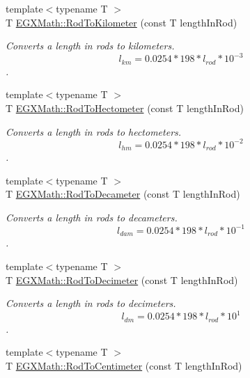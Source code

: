 \begin{DoxyCompactItemize}
{\footnotesize template$<$typename T $>$ }\\T \mbox{\hyperlink{group___e_g_x_math-_conversions-_length_conversions-_surveyors-_rod-_s_i_ga074418cb0c673bef5eed361a610866a0}{E\+G\+X\+Math\+::\+Rod\+To\+Kilometer}} (const T length\+In\+Rod)
\begin{DoxyCompactList}\small\item\em Converts a length in rods to kilometers. \[ l_{km}=0.0254 * 198 * l_{rod} * 10^{-3} \]. \end{DoxyCompactList}\item 
{\footnotesize template$<$typename T $>$ }\\T \mbox{\hyperlink{group___e_g_x_math-_conversions-_length_conversions-_surveyors-_rod-_s_i_ga9a5cefa380459848ac99b3f9784817ce}{E\+G\+X\+Math\+::\+Rod\+To\+Hectometer}} (const T length\+In\+Rod)
\begin{DoxyCompactList}\small\item\em Converts a length in rods to hectometers. \[ l_{hm}=0.0254 * 198 * l_{rod} * 10^{-2} \]. \end{DoxyCompactList}\item 
{\footnotesize template$<$typename T $>$ }\\T \mbox{\hyperlink{group___e_g_x_math-_conversions-_length_conversions-_surveyors-_rod-_s_i_gaecb39eb3cc482aa4586ecbce219b6f34}{E\+G\+X\+Math\+::\+Rod\+To\+Decameter}} (const T length\+In\+Rod)
\begin{DoxyCompactList}\small\item\em Converts a length in rods to decameters. \[ l_{dam}=0.0254 * 198 * l_{rod} * 10^{-1} \]. \end{DoxyCompactList}\item 
{\footnotesize template$<$typename T $>$ }\\T \mbox{\hyperlink{group___e_g_x_math-_conversions-_length_conversions-_surveyors-_rod-_s_i_gafaf133f63aeedbfc19093745bd005dca}{E\+G\+X\+Math\+::\+Rod\+To\+Decimeter}} (const T length\+In\+Rod)
\begin{DoxyCompactList}\small\item\em Converts a length in rods to decimeters. \[ l_{dm}=0.0254 * 198 * l_{rod} * 10^{1} \]. \end{DoxyCompactList}\item 
{\footnotesize template$<$typename T $>$ }\\T \mbox{\hyperlink{group___e_g_x_math-_conversions-_length_conversions-_surveyors-_rod-_s_i_ga606f24d4f57fa79ea29cd16903899849}{E\+G\+X\+Math\+::\+Rod\+To\+Centimeter}} (const T length\+In\+Rod)

\end{DoxyCompactItemize}
